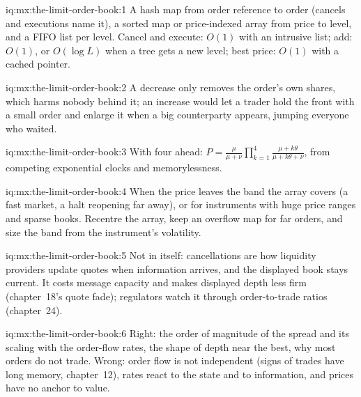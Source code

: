 \begin{solution}{iq:mx:the-limit-order-book:1}
A hash map from order reference to order (cancels and executions name it), a sorted map or price-indexed array from price to level, and a FIFO
list per level. Cancel and execute: $O(1)$ with an intrusive list; add: $O(1)$, or $O(\log L)$ when a tree gets a new level; best price: $O(1)$ with a
cached pointer. 
\end{solution}

\begin{solution}{iq:mx:the-limit-order-book:2}
A decrease only removes the order's own shares, which harms nobody behind it; an increase would let a trader hold the front with a small order and
enlarge it when a big counterparty appears, jumping everyone who waited. 
\end{solution}

\begin{solution}{iq:mx:the-limit-order-book:3}
With four ahead: $P=\tfrac{\mu}{\mu+\nu}\prod_{k=1}^{4}\tfrac{\mu+k\theta}{\mu+k\theta+\nu}$, from competing exponential clocks and memorylessness.
\end{solution}

\begin{solution}{iq:mx:the-limit-order-book:4}
When the price leaves the band the array covers (a fast market, a halt reopening far away), or for instruments with huge price ranges and sparse
books. Recentre the array, keep an overflow map for far orders, and size the band from the instrument's volatility. 
\end{solution}

\begin{solution}{iq:mx:the-limit-order-book:5}
Not in itself: cancellations are how liquidity providers update quotes when information arrives, and the displayed book stays current. It costs
message capacity and makes displayed depth less firm (chapter~18's quote fade); regulators watch it through order-to-trade ratios (chapter~24).
\end{solution}

\begin{solution}{iq:mx:the-limit-order-book:6}
Right: the order of magnitude of the spread and its scaling with the order-flow rates, the shape of depth near the best, why most orders do not trade.
Wrong: order flow is not independent (signs of trades have long memory, chapter~12), rates react to the state and to information, and prices have no
anchor to value. 
\end{solution}
